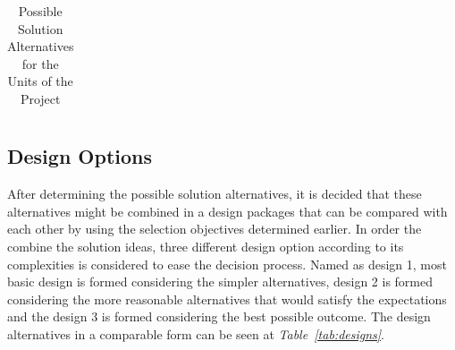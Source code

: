 \documentclass[a4paper,12pt]{article}
\begin{document}
\begin{table}[H]
\begin{tabular}{| c | c  c  c |}
       
       \\\hline
      
  \end{tabular}
  \caption{Possible Solution Alternatives for the  Units of the Project}
  \label{tab:solns}
\end{table}				
	
	
	\subsection{Design Options}
	
	After determining the possible solution alternatives, it is decided that these alternatives might be combined in a design packages that can be compared with each other by using the selection objectives determined earlier.  In order the combine the solution ideas, three different design option according to its complexities is considered to ease the decision process. Named as design 1, most basic design is formed considering the simpler alternatives, design 2 is formed considering the more reasonable alternatives that would satisfy the expectations and the design 3 is formed considering the best possible outcome. The design alternatives in a comparable form can be seen at \textit{Table~\ref{tab:designs}}. 
	
\end{document}

